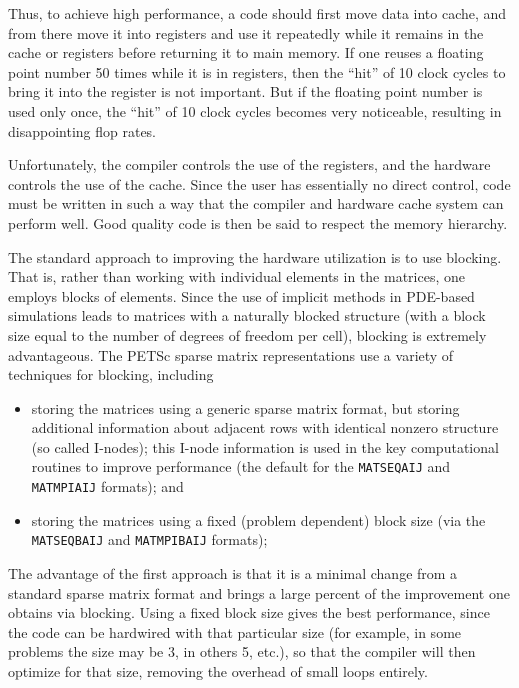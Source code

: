 Thus, to achieve high performance, a code should first move data into
cache, and from there move it into registers and use it repeatedly
while it remains in the cache or registers before returning it to main
memory. If one reuses a floating point number 50 times while it is in
registers, then the ``hit'' of 10 clock cycles to bring it into the
register is not important. But if the floating point number is used
only once, the ``hit'' of 10 clock cycles becomes very noticeable,
resulting in disappointing flop rates.

Unfortunately, the compiler controls the use of the registers, and the
hardware controls the use of the cache. Since the user has essentially
no direct control, code must be written in such a way that the
compiler and hardware cache system can perform well. Good quality code
is then be said to respect the memory hierarchy.

The standard approach to improving the hardware utilization is to use
blocking. That is, rather than working with individual elements in
the matrices, one employs blocks of elements.  Since the use of
implicit methods in PDE-based simulations leads to matrices with a
naturally blocked structure (with a block size equal to the number of
degrees of freedom per cell), blocking is extremely advantageous.  The
PETSc sparse matrix representations use a variety
of techniques for blocking, including

\begin{itemize}
\item storing the matrices using a generic sparse matrix format, but
   storing additional information about adjacent rows with identical
   nonzero structure (so called I-nodes); this I-node information is
   used in the key computational routines to improve performance
    (the default for the \lstinline{MATSEQAIJ} and \lstinline{MATMPIAIJ} formats); and
\item storing the matrices using a fixed (problem dependent) block size
  (via the \lstinline{MATSEQBAIJ} and \lstinline{MATMPIBAIJ} formats);
\end{itemize}

The advantage of the first approach is that it is a minimal change
from a standard sparse matrix format and brings a large percent of the
improvement one obtains via blocking.  Using a fixed block size gives
the best performance, since the code can be hardwired with that
particular size (for example, in some problems the size may be 3, in
others 5, etc.), so that the compiler will then optimize for that
size, removing the overhead of small loops entirely.


